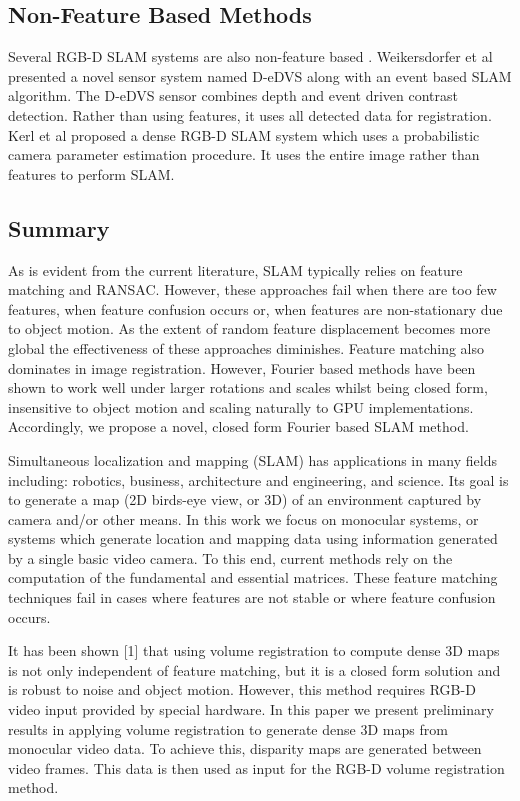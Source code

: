 \subsection{Non-Feature Based Methods}
Several RGB-D SLAM systems are also non-feature based \cite{Weikersdorfer14Event,Izadi11Kinectfusion,Kerl13Dense}. Weikersdorfer et al \cite{Weikersdorfer14Event} presented a novel sensor system named D-eDVS along with an event based SLAM algorithm. The D-eDVS sensor combines depth and event driven contrast detection. Rather than using features, it uses all detected data for registration. Kerl et al \cite{Kerl13Dense} proposed a dense RGB-D SLAM system which uses a probabilistic camera parameter estimation procedure. It uses the entire image rather than features to perform SLAM.
\subsection{Summary}
As is evident from the current literature, SLAM typically relies on feature matching and RANSAC. However, these approaches fail when there are too few features, when feature confusion occurs or, when features are non-stationary due to object motion. As the extent of random feature displacement becomes more global the effectiveness of these approaches diminishes. Feature matching also dominates in image registration. However, Fourier based methods have been shown to work well under larger rotations and scales \cite{Gonzalez11Improving} whilst being closed form, insensitive to object motion and scaling naturally to GPU implementations. Accordingly, we propose a novel, closed form Fourier based SLAM method.

Simultaneous localization and mapping (SLAM) has applications in many fields including: robotics, business, architecture and engineering, and science. Its goal is to generate a map (2D birds-eye view, or 3D) of an environment captured by camera and/or other means. In this work we focus on monocular systems, or systems which generate location and mapping data using information generated by a single basic video camera. To this end, current methods rely on the computation of the fundamental and essential matrices. These feature matching techniques fail in cases where features are not stable or where feature confusion occurs. 

It has been shown [1] that using volume registration to compute dense 3D maps is not only independent of feature matching, but it is a closed form solution and is robust to noise and object motion. However, this method requires RGB-D video input provided by special hardware. In this paper we present preliminary results in applying volume registration to generate dense 3D maps from monocular video data. To achieve this, disparity maps are generated between video frames. This data is then used as input for the RGB-D volume registration method.

